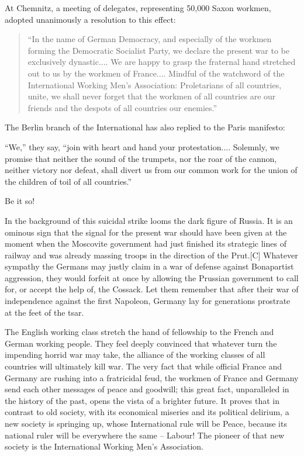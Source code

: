 \documentclass{article}
\begin{document}
At Chemnitz, a meeting of delegates, representing 50,000 Saxon workmen,
adopted unanimously a resolution to this effect:

\begin{quote}

``In the name of German Democracy, and especially of the workmen forming
the Democratic Socialist Party, we declare the present war to be
exclusively dynastic.... We are happy to grasp the fraternal hand
stretched out to us by the workmen of France.... Mindful of the watchword
of the International Working Men’s Association: Proletarians of all
countries, unite, we shall never forget that the workmen of all countries
are our friends and the despots of all countries our enemies.''

\end{quote}

The Berlin branch of the International has also replied to the Paris
manifesto:

``We,'' they say, ``join with heart and hand your protestation....
Solemnly, we promise that neither the sound of the trumpets, nor the roar
of the cannon, neither victory nor defeat, shall divert us from our common
work for the union of the children of toil of all countries.''

Be it so!

In the background of this suicidal strike looms the dark figure of Russia.
It is an ominous sign that the signal for the present war should have been
given at the moment when the Moscovite government had just finished its
strategic lines of railway and was already massing troops in the direction
of the Prut.[C] Whatever sympathy the Germans may justly claim in a war of
defense against Bonapartist aggression, they would forfeit at once by
allowing the Prussian government to call for, or accept the help of, the
Cossack. Let them remember that after their war of independence against
the first Napoleon, Germany lay for generations prostrate at the feet of
the tsar.

The English working class stretch the hand of fellowship to the French and
German working people. They feel deeply convinced that whatever turn the
impending horrid war may take, the alliance of the working classes of all
countries will ultimately kill war. The very fact that while official
France and Germany are rushing into a fratricidal feud, the workmen of
France and Germany send each other messages of peace and goodwill; this
great fact, unparalleled in the history of the past, opens the vista of
a brighter future. It proves that in contrast to old society, with its
economical miseries and its political delirium, a new society is springing
up, whose International rule will be Peace, because its national ruler
will be everywhere the same – Labour! The pioneer of that new society is
the International Working Men’s Association.
\end{document}
